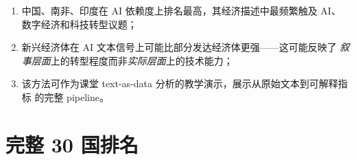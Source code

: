 \documentclass[11pt,a4paper]{article}
\begin{document}
\begin{enumerate}[nosep]
    \item 中国、南非、印度在 AI 依赖度上排名最高，其经济描述中最频繁触及 AI、
    数字经济和科技转型议题；
    \item 新兴经济体在 AI 文本信号上可能比部分发达经济体更强——这可能反映了
    \emph{叙事层面}上的转型程度而非\emph{实际层面}上的技术能力；
    \item 该方法可作为课堂 text-as-data 分析的教学演示，展示从原始文本到可解释指标
    的完整 pipeline。
\end{enumerate}

\newpage
\appendix
\section{完整 30 国排名}
\label{sec:full}
\end{document}
